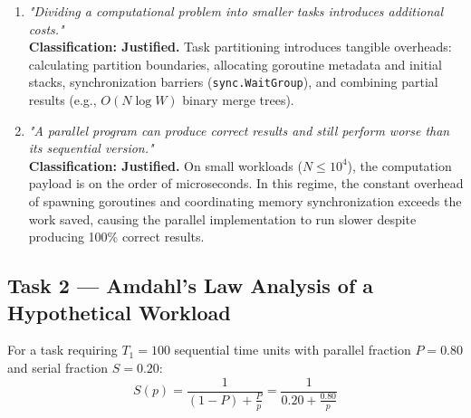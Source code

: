 \documentclass[11pt]{article}
\begin{document}
\begin{enumerate}[label=\textbf{Statement \arabic*:}, leftmargin=1.6em, itemsep=0.4em]
    \item \textit{"Dividing a computational problem into smaller tasks introduces additional costs."}\\
    \textbf{Classification: Justified.} Task partitioning introduces tangible overheads: calculating partition boundaries, allocating goroutine metadata and initial stacks, synchronization barriers (\texttt{sync.WaitGroup}), and combining partial results (e.g., $O(N \log W)$ binary merge trees).

    \item \textit{"A parallel program can produce correct results and still perform worse than its sequential version."}\\
    \textbf{Classification: Justified.} On small workloads ($N \le 10^4$), the computation payload is on the order of microseconds. In this regime, the constant overhead of spawning goroutines and coordinating memory synchronization exceeds the work saved, causing the parallel implementation to run slower despite producing 100\% correct results.
\end{enumerate}


\newpage
\subsection*{Task 2 --- Amdahl's Law Analysis of a Hypothetical Workload}
For a task requiring $T_1 = 100$ sequential time units with parallel fraction $P = 0.80$ and serial fraction $S = 0.20$:
\begin{equation}
    S(p) = \frac{1}{(1 - P) + \frac{P}{p}} = \frac{1}{0.20 + \frac{0.80}{p}}
\end{equation}
\end{document}
